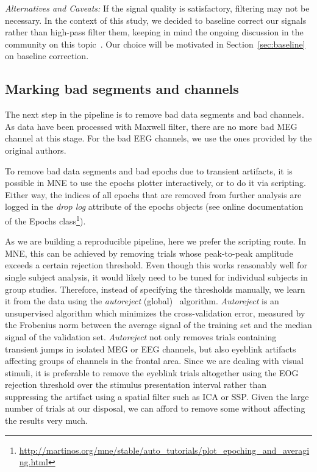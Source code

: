 \emph{Alternatives and Caveats:} If the signal quality is satisfactory, filtering may not be necessary. In the context of this study, we decided to baseline correct our signals rather than high-pass filter them, keeping in mind the ongoing discussion in the community on this topic~\citep{tanner2015inappropriate,rousselet2012does,widmann2012filter,acunzo2012systematic,maess2016high}. Our choice will be motivated in Section~\ref{sec:baseline} on baseline correction.

\subsection{Marking bad segments and channels}

The next step in the pipeline is to remove bad data segments and bad channels. As data have been processed with Maxwell filter, there are no more bad \ac{MEG} channel at this stage. For the bad EEG channels, we use the ones provided by the original authors.

To remove bad data segments and bad epochs due to transient artifacts, it is possible in MNE to use the epochs plotter interactively, or to do it via scripting. Either way, the indices of all epochs that are removed from further analysis are logged in the \textit{drop log} attribute of the epochs objects (see online documentation of the Epochs class\footnote{\url{http://martinos.org/mne/stable/auto_tutorials/plot_epoching_and_averaging.html}}).

As we are building a reproducible pipeline, here we prefer the scripting route. In MNE, this can be achieved by removing trials whose peak-to-peak amplitude exceeds a certain rejection threshold. Even though this works reasonably well for single subject analysis, it would likely need to be tuned for individual subjects in group studies. Therefore, instead of specifying the thresholds manually, we learn it from the data using the \emph{autoreject} (global)~\citep{jas2017autoreject} algorithm. \emph{Autoreject} is an unsupervised algorithm which minimizes the cross-validation error, measured by the Frobenius norm between the average signal of the training set and the median signal of the validation set. \emph{Autoreject} not only removes trials containing transient jumps in isolated \ac{MEG} or \ac{EEG} channels, but also eyeblink artifacts affecting groups of channels in the frontal area. Since we are dealing with visual stimuli, it is preferable to remove the eyeblink trials altogether using the \ac{EOG} rejection threshold over the stimulus presentation interval rather than suppressing the artifact using a spatial filter such as \ac{ICA} or \ac{SSP}. Given the large number of trials at our disposal, we can afford to remove some without affecting the results very much.

